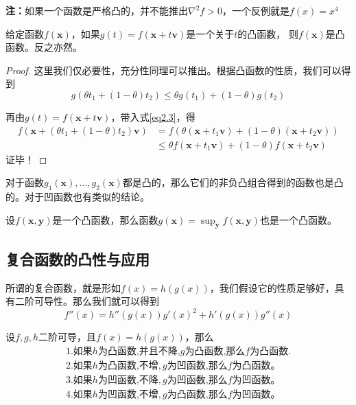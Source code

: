 \documentclass[lang=cn,10pt]{elegantbook}
\newcommand\bv[1]{\boldsymbol{#1}}
\begin{document}
\textbf{注：}如果一个函数是严格凸的，并不能推出$\nabla^2 f > 0$，一个反例就是$f(x) = x^4$

\begin{proposition}
	给定函数$f(\bv{x})$，如果$g(t) = f(\bv{x}+t\bv{v})$是一个关于$t$的凸函数，
	则$f(\bv{x})$是凸函数。反之亦然。
\end{proposition}

\begin{proof}
	这里我们仅必要性，充分性同理可以推出。根据凸函数的性质，我们可以得到
	\begin{equation} \label{eq2.3}
		g(\theta t_1 + (1-\theta)t_2) \leq \theta g(t_1) + (1-\theta)g(t_2)
	\end{equation}
	\par 再由$g(t) = f(\bv{x}+t\bv{v})$，带入式\ref{eq2.3}，得
	\begin{equation*}
		\begin{aligned}
			f(\bv{x}+(\theta t_1 + (1-\theta)t_2)\bv{v}) & = f(\theta (\bv{x} + t_1 \bv{v}) + (1-\theta)(\bv{x} + t_2 \bv{v})) \\
			                                             & \leq \theta f(\bv{x}+t_1\bv{v}) + (1-\theta)f(\bv{x}+t_2\bv{v})
		\end{aligned}
	\end{equation*}
	证毕！
\end{proof}

\begin{lemma}
	对于函数$g_1(\bv{x}),\ldots,g_2(\bv{x})$都是凸的，那么它们的非负凸组合得到的函数也是凸的。对于凹函数也有类似的结论。
\end{lemma}

\begin{lemma}
	设$f(\bv{x,y})$是一个凸函数，那么函数$g(\bv{x}) = \sup_{\bv{y}}f(\bv{x,y}) $也是一个凸函数。
\end{lemma}

\subsection*{复合函数的凸性与应用}
所谓的复合函数，就是形如$f(x)=h(g(x))$，我们假设它的性质足够好，具有二阶可导性。那么我们就可以得到
\begin{equation}
	f''(x)=h''(g(x))g'(x)^2+h'(g(x))g''(x)
\end{equation}
\begin{theorem}
	\label{th2.1.8}
	设$f,g,h$二阶可导，且$f(x)=h(g(x))$，那么
	\begin{equation*}
		\begin{gathered}
			1.\text{如果}h\text{为凸函数,并且不降,}g\text{为凸函数,那么}f\text{为凸函数}. \\
			2.\text{如果}h\text{为凸函数,不增},g\text{为凹函数,那么}f\text{为凸函数。} \\
			3.\text{如果}h\text{为凹函数,不降},g\text{为凹函数,那么}f\text{为凹函数。} \\
			4.\text{如果}h\text{为凹函数,不增},g\text{为凸函数,那么}f\text{为凹函数。}
		\end{gathered}
	\end{equation*}
\end{theorem}
\end{document}

